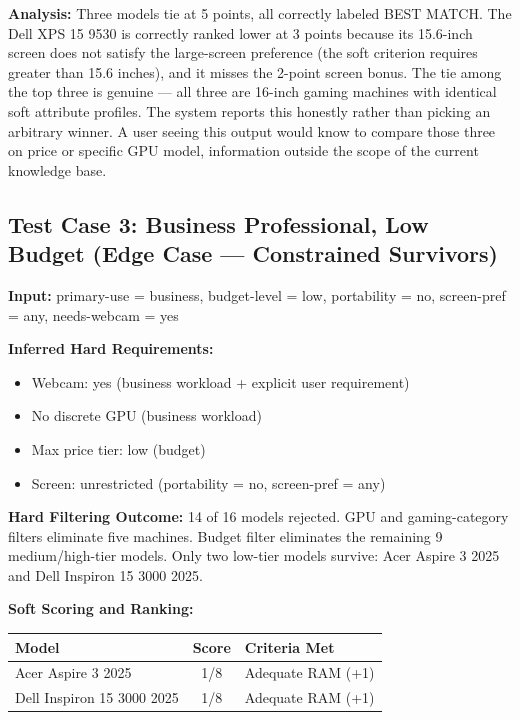 \documentclass[12pt,a4paper]{article}
\begin{document}
\textbf{Analysis:} Three models tie at 5 points, all correctly labeled BEST MATCH. The Dell XPS 15 9530 is correctly ranked lower at 3 points because its 15.6-inch screen does not satisfy the large-screen preference (the soft criterion requires greater than 15.6 inches), and it misses the 2-point screen bonus. The tie among the top three is genuine --- all three are 16-inch gaming machines with identical soft attribute profiles. The system reports this honestly rather than picking an arbitrary winner. A user seeing this output would know to compare those three on price or specific GPU model, information outside the scope of the current knowledge base.

\subsection{Test Case 3: Business Professional, Low Budget (Edge Case --- Constrained Survivors)}

\textbf{Input:} primary-use = business, budget-level = low, portability = no, screen-pref = any, needs-webcam = yes

\textbf{Inferred Hard Requirements:}
\begin{itemize}
    \item Webcam: yes (business workload + explicit user requirement)
    \item No discrete GPU (business workload)
    \item Max price tier: low (budget)
    \item Screen: unrestricted (portability = no, screen-pref = any)
\end{itemize}

\textbf{Hard Filtering Outcome:} 14 of 16 models rejected. GPU and gaming-category filters eliminate five machines. Budget filter eliminates the remaining 9 medium/high-tier models. Only two low-tier models survive: Acer Aspire 3 2025 and Dell Inspiron 15 3000 2025.

\textbf{Soft Scoring and Ranking:}

\begin{center}
\renewcommand{\arraystretch}{1.4}
\begin{tabular}{lcp{6cm}}
\toprule
\textbf{Model} & \textbf{Score} & \textbf{Criteria Met} \\
\midrule
Acer Aspire 3 2025         & 1/8 & Adequate RAM (+1) \\
Dell Inspiron 15 3000 2025 & 1/8 & Adequate RAM (+1) \\
\bottomrule
\end{tabular}
\end{center}
\end{document}
